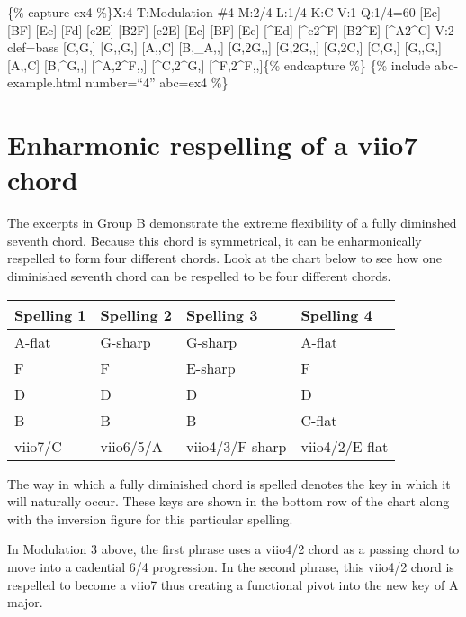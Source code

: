 \documentclass{book}
\begin{document}
\{\% capture ex4 \%\}X:4 T:Modulation \#4 M:2/4 L:1/4 K:C V:1 Q:1/4=60
{[}Ec{]} {[}BF{]}\textbar{} {[}Ec{]} {[}Fd{]}\textbar{} {[}c2E{]}\textbar{}
{[}B2F{]}\textbar{} {[}c2E{]}\textbar{} {[}Ec{]} {[}BF{]}\textbar{} {[}Ec{]}
{[}\^{}Ed{]}\textbar{} {[}\^{}c2\^{}F{]}\textbar{} {[}B2\^{}E{]}\textbar{}
{[}\^{}A2\^{}C{]}\textbar{]} V:2 clef=bass {[}C,G,{]} {[}G,,G,{]}\textbar{}
{[}A,,C{]} {[}B,\_A,,{]}\textbar{} {[}G,2G,,{]}\textbar{}
{[}G,2G,,{]}\textbar{} {[}G,2C,{]}\textbar{} {[}C,G,{]} {[}G,,G,{]}\textbar{}
{[}A,,C{]} {[}B,\^{}G,,{]}\textbar{} {[}\^{}A,2\^{}F,,{]}\textbar{}
{[}\^{}C,2\^{}G,{]}\textbar{} {[}\^{}F,2\^{}F,,{]}\textbar{]}\{\% endcapture
\%\} \{\% include abc-example.html number=``4'' abc=ex4 \%\}

\hypertarget{enharmonic-respelling-of-a-viio7-chord}{%
\section{Enharmonic respelling of a viio7
chord}\label{enharmonic-respelling-of-a-viio7-chord}}

The excerpts in Group B demonstrate the extreme flexibility of a fully
diminshed seventh chord. Because this chord is symmetrical, it can be
enharmonically respelled to form four different chords. Look at the chart
below to see how one diminished seventh chord can be respelled to be four
different chords.

\begin{longtable}[]{@{}llll@{}}
\toprule
Spelling 1 & Spelling 2 & Spelling 3 & Spelling 4 \\
\midrule
\endhead
A-flat & G-sharp & G-sharp & A-flat \\
F & F & E-sharp & F \\
D & D & D & D \\
B & B & B & C-flat \\
viio7/C & viio6/5/A & viio4/3/F-sharp & viio4/2/E-flat \\
\bottomrule
\end{longtable}

The way in which a fully diminished chord is spelled denotes the key in which
it will naturally occur. These keys are shown in the bottom row of the chart
along with the inversion figure for this particular spelling.

In Modulation 3 above, the first phrase uses a viio4/2 chord as a passing
chord to move into a cadential 6/4 progression. In the second phrase, this
viio4/2 chord is respelled to become a viio7 thus creating a functional pivot
into the new key of A major.
\end{document}
